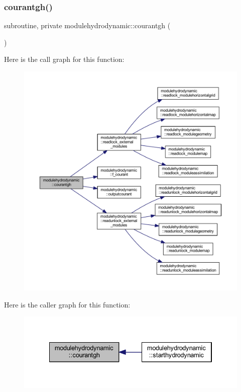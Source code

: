 \subsubsection{\texorpdfstring{courantgh()}{courantgh()}}
{\footnotesize\ttfamily subroutine, private modulehydrodynamic\+::courantgh (\begin{DoxyParamCaption}{ }\end{DoxyParamCaption})\hspace{0.3cm}{\ttfamily [private]}}

Here is the call graph for this function\+:\nopagebreak
\begin{figure}[H]
\begin{center}
\leavevmode
\includegraphics[width=350pt]{namespacemodulehydrodynamic_a6effd02220d9411965b29d5f27b26d92_cgraph}
\end{center}
\end{figure}
Here is the caller graph for this function\+:\nopagebreak
\begin{figure}[H]
\begin{center}
\leavevmode
\includegraphics[width=334pt]{namespacemodulehydrodynamic_a6effd02220d9411965b29d5f27b26d92_icgraph}
\end{center}
\end{figure}
\mbox{\label{namespacemodulehydrodynamic_ab70188c3f183ae7e6142adec6d3ea9fe}} 
